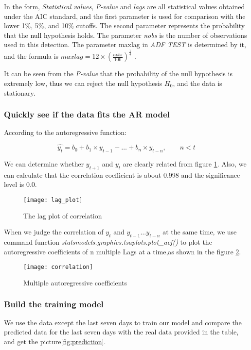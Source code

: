 \documentclass{mcmthesis}
\begin{document}
In the form, \textit{Statistical values}, \textit{P-value} and \textit{lags} are all statistical values obtained under the AIC standard, and the first parameter is used for comparison with the lower 1\%, 5\%, and 10\% cutoffs.
The second parameter represents the probability that the null hypothesis holds.
The parameter \textit{nobs} is the number of observations used in this detection.
The parameter maxlag in \textit{ADF TEST} is determined by it, and the formula is $ \displaystyle maxlag = 12 \times ( \frac{nobs}{100}) ^\frac{1}{4} $ .

It can be seen from the \textit{P-value} that the probability of the null hypothesis is extremely low, thus we can reject the null hypothesis $H_0$, and the data is stationary.

\subsubsection{Quickly see if the data fits the AR model}
  According to the autoregressive function:

  \begin{equation}
    \hat{y_t} = b_0 + b_1 \times y_{t - 1} + \ldots + b_n \times y_{t - n}, \qquad n < t
  \end{equation}

  We can determine whether $ y_{t + 1}$ and $ y_t $ are clearly related from figure \ref{fig:lag_plot}. Also, we can calculate that the correlation coefficient is about 0.998 and the significance level is 0.0.

  \begin{figure}[H]
    \centering
    \texttt{[image: lag\_plot]}
    \caption{The lag plot of correlation}
    \label{fig:lag_plot}
  \end{figure}

  When we judge the correlation of $ y_t$ and $ y_{t - 1} \ldots y_{t - n} $ at the same time, we use command function \textit{statsmodels.graphics.tsaplots.plot\_acf()} to plot the autoregressive coefficients of n multiple Lags at a time,as shown in the figure \ref{fig:correlation}.

  \begin{figure}[H]
    \centering
    \texttt{[image: correlation]}
    \caption{Multiple autoregressive coefficients}
    \label{fig:correlation}
  \end{figure}

\subsubsection{Build the training model}
We use the data except the last seven days to train our model and compare the predicted data for the last seven days with the real data provided in the table, and get the picture\ref{fig:prediction}.
\end{document}
